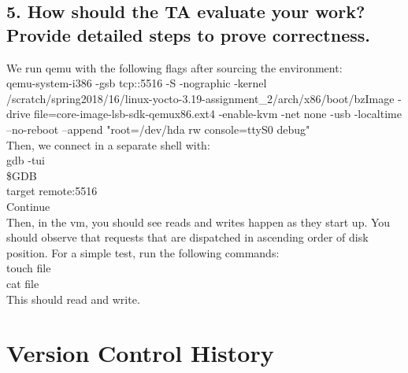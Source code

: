 \documentclass[letterpaper,10pt]{article}
\begin{document}
\subsection{5. How should the TA evaluate your work? Provide detailed steps to prove correctness.}
We run qemu with the following flags after sourcing the environment:\\
qemu-system-i386 -gsb tcp::5516 -S -nographic -kernel /scratch/spring2018/16/linux-yocto-3.19-assignment\_2/arch/x86/boot/bzImage -drive file=core-image-lsb-sdk-qemux86.ext4 -enable-kvm -net none -usb -localtime --no-reboot --append "root=/dev/hda rw console=ttyS0 debug"\\
Then, we connect in a separate shell with:\\
gdb -tui\\
\$GDB\\
target remote:5516\\
Continue\\
Then, in the vm, you should see reads and writes happen as they start up. You should observe that requests that are dispatched in ascending order of disk position. For a simple test, run the following commands:\\
touch file\\
cat file\\
This should read and write.

\section{Version Control History}


\nocite{*}


\end{document}
